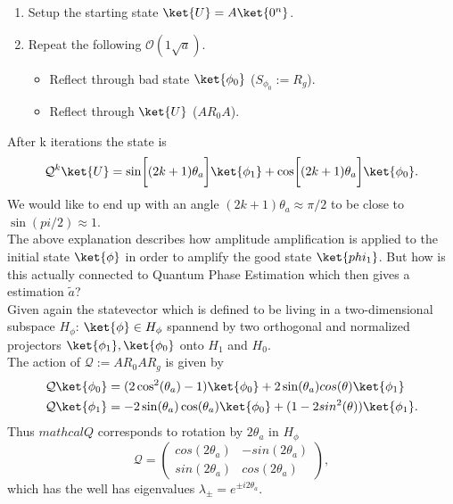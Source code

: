 \documentclass[../../main.tex]{subfiles}
\begin{document}
\begin{enumerate}
  \item{Setup the starting state $\ket{U} = A\ket{0^n}$}.
  \item{Repeat the following $\mathcal{O}(1 \sqrt{a})$}.
  \begin{itemize}
    \item Reflect through bad state $\ket{\phi_0}$ ($S_{\phi_0} := R_g$).
    \item Reflect through $\ket{U}$ ($AR_0A$).
  \end{itemize}
\end{enumerate}
After k iterations the state is 
\begin{equation}\label{eq:Qktimes}
\mathcal{Q}^k \ket{U} = \sin \biggl[ (2k+1)\theta_a \biggr] \ket{\phi_1} + \cos \biggl[ (2k+1)\theta_a \biggr] \ket{\phi_0}.
\end{equation}
We would like to end up with an angle $(2k+1)\theta_a \approx \pi/2$ to be close to $\sin(pi/2) \approx 1$.\\
The above explanation describes how amplitude amplification is applied to the initial state $\ket{\phi}$ in order to amplify the good state $\ket{phi_1}$.
But how is this actually connected to Quantum Phase Estimation which then gives a estimation $\tilde{a}$?\\
Given again the statevector which is defined to be living in a two-dimensional subspace $H_{\phi}$: $\ket{\phi} \in H_{\phi}$ spannend by two orthogonal and normalized
projectors $\ket{\phi_1}, \ket{\phi_0}$ onto $H_1$ and $H_0$.\\
The action of $\mathcal{Q} := AR_0AR_g$ is given by
\begin{align}\label{eq:actionOfQ}
  \mathcal{Q} \ket{\phi_0} &= (2 \cos^2(\theta_a) - 1 )\ket{\phi_0} + 2 \sin(\theta_a)cos(\theta) \ket{\phi_1}\\
  \mathcal{Q} \ket{\phi_1} &= -2 \sin(\theta_a) \cos(\theta_a) \ket{\phi_0} + (1-2 sin^2(\theta))\ket{\phi_1}.
\end{align}
Thus $mathcal{Q}$ corresponds to rotation by $2\theta_a$ in $H_\phi$
\begin{equation}\label{eq:rotationMatrix}
  \mathcal{Q} = 
\begin{pmatrix}
      cos(2\theta_a) & -sin(2 \theta_a) \\
      sin(2\theta_a) & cos(2 \theta_a) 
\end{pmatrix},
\end{equation}
which has the well has eigenvalues $\lambda_{\pm} = e^{\pm i 2 \theta_a}$.\\
\end{document}

